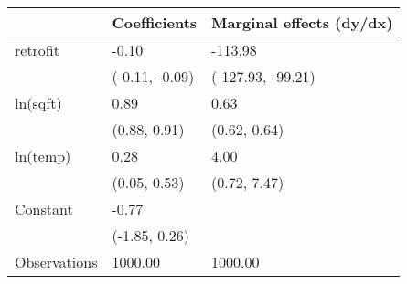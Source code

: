 \begin{tabular}{lll}
\toprule
 & Coefficients & Marginal effects (dy/dx) \\
\midrule
retrofit & -0.10 & -113.98 \\
  & (-0.11, -0.09) & (-127.93, -99.21) \\
ln(sqft) & 0.89 & 0.63 \\
  & (0.88, 0.91) & (0.62, 0.64) \\
ln(temp) & 0.28 & 4.00 \\
  & (0.05, 0.53) & (0.72, 7.47) \\
Constant & -0.77 &   \\
  & (-1.85, 0.26) &   \\
Observations & 1000.00 & 1000.00 \\
\bottomrule
\end{tabular}
